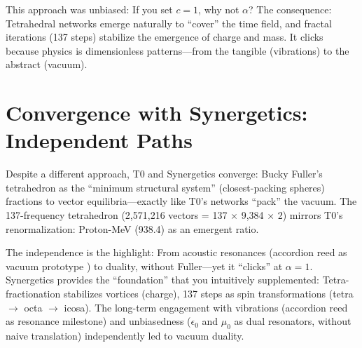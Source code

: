 	This approach was unbiased: If you set $c = 1$, why not $\alpha$? The consequence: Tetrahedral networks emerge naturally to ``cover'' the time field, and fractal iterations (137 steps) stabilize the emergence of charge and mass. It clicks because physics is dimensionless patterns—from the tangible (vibrations) to the abstract (vacuum).
	
	\section{Convergence with Synergetics: Independent Paths}
	Despite a different approach, T0 and Synergetics converge: Bucky Fuller's tetrahedron as the ``minimum structural system'' \cite{fuller1975} (closest-packing spheres) fractions to vector equilibria—exactly like T0's networks ``pack'' the vacuum. The 137-frequency tetrahedron (2,571,216 vectors = 137 $\times$ 9,384 $\times$ 2) mirrors T0's renormalization: Proton-MeV (938.4) as an emergent ratio.
	
	The independence is the highlight: From acoustic resonances (accordion reed as vacuum prototype \cite{ricot2005}) to duality, without Fuller—yet it ``clicks'' at $\alpha=1$. Synergetics provides the ``foundation'' that you intuitively supplemented: Tetra-fractionation stabilizes vortices (charge), 137 steps as spin transformations (tetra $\to$ octa $\to$ icosa). The long-term engagement with vibrations (accordion reed as resonance milestone) and unbiasedness ($\epsilon_0$ and $\mu_0$ as dual resonators, without naive translation) independently led to vacuum duality.
	
	\begin{table}[htbp]
		\caption{Convergences: T0 and Synergetics—extended by duality elements}
		\label{tab:konvergenz}
	\end{table}
	
